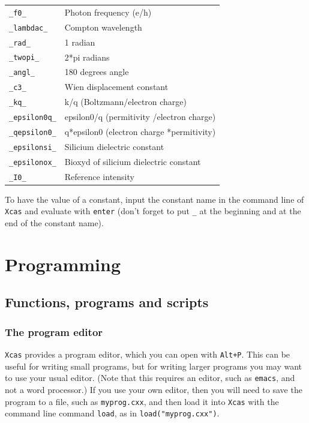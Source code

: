 \documentclass[a4paper,11pt]{book}
\begin{document}
\begin{center}
\begin{tabular}{|l|l|}
{\tt \_f0\_} &Photon frequency (e/h)\\
{\tt \_lambdac\_} &Compton wavelength\\
{\tt \_rad\_} &1 radian\\
{\tt \_twopi\_} &2*pi radians\\
{\tt \_angl\_} &180 degrees angle\\
{\tt \_c3\_} &Wien displacement constant\\
{\tt \_kq\_} & k/q (Boltzmann/electron charge)\\
{\tt \_epsilon0q\_} &epsilon0/q (permitivity /electron charge)\\
{\tt \_qepsilon0\_} &q*epsilon0 (electron charge *permitivity)\\
{\tt \_epsilonsi\_} &Silicium dielectric constant\\
{\tt \_epsilonox\_} &Bioxyd of silicium dielectric constant\\
{\tt \_I0\_} &Reference intensity\\
\hline
\end{tabular}
\end{center}
To have the value of a constant, input the constant name in the command line 
of {\tt Xcas} and evaluate with {\tt enter} (don't forget to put 
{\tt \_} at the beginning and at the end of the constant name).

\chapter{Programming}

\section{Functions, programs and scripts}

\subsection{The program editor}

\texttt{Xcas} provides a program editor, which you can open with
\texttt{Alt+P}.  This can be useful for writing small programs, but
for writing larger programs you may want to use your usual editor.
(Note that this requires an editor, such as \texttt{emacs}, and not a
word processor.)    If you use your own editor, then you will need to
save the program to a file, such as \texttt{myprog.cxx}, and then load
it into \texttt{Xcas} with the command line command \texttt{load},  as
in \texttt{load("myprog.cxx")}.
\end{document}
